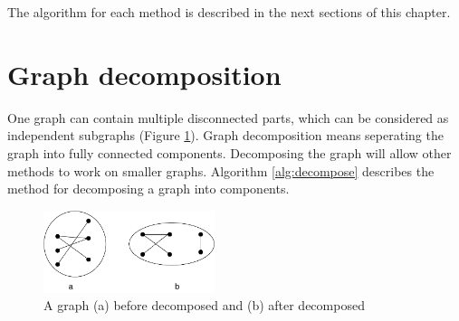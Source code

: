 \documentclass[a4paper]{report}
\begin{document}
	The algorithm for each method is described in the next sections of this chapter.
	

		\section{Graph decomposition}
		One graph can contain multiple disconnected parts, which can be considered as independent subgraphs (Figure \ref{fig:decompose}). Graph decomposition means seperating the graph into fully connected components. Decomposing the graph will allow other methods to work on smaller graphs. Algorithm \ref{alg:decompose} describes the method for decomposing a graph into components.\\
		
		\begin{figure}[h]
			\centering
			\includegraphics[width=50mm,scale=0.5]{figures/DecomposedGraph.pdf}
			\caption{A graph (a) before decomposed and (b) after decomposed}
			\label{fig:decompose}
		\end{figure}
	
\end{document}
